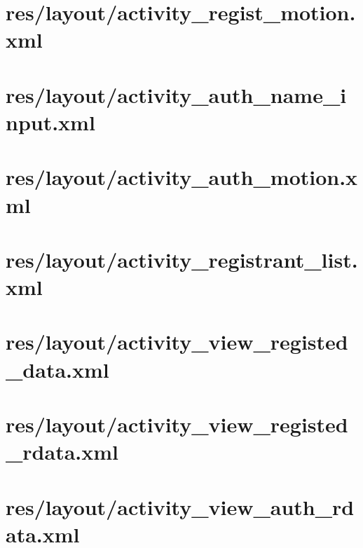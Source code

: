 \documentclass[11pt]{jreport}
\renewcommand{\slash}{/}
\begin{document}
    \section{res\slash layout\slash activity\_regist\_motion.xml}
    

    \section{res\slash layout\slash activity\_auth\_name\_input.xml}
    

    \section{res\slash layout\slash activity\_auth\_motion.xml}
    

    \section{res\slash layout\slash activity\_registrant\_list.xml}
    

    \section{res\slash layout\slash activity\_view\_registed\_data.xml}
    

    \section{res\slash layout\slash activity\_view\_registed\_rdata.xml}
    

    \section{res\slash layout\slash activity\_view\_auth\_rdata.xml}
    
\end{document}
